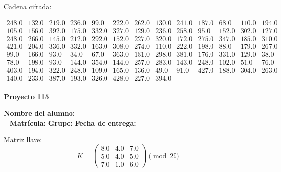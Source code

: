 \documentclass[12pt]{article}
\begin{document}
Cadena cifrada:
\begin{center}
$\begin{array}{lllllllllllll}
248.0 & 132.0 & 219.0 & 236.0 & 99.0 & 222.0 & 262.0 & 130.0 & 241.0 & 187.0 & 68.0 & 110.0 & 194.0\\
105.0 & 156.0 & 392.0 & 175.0 & 332.0 & 327.0 & 129.0 & 236.0 & 258.0 & 95.0 & 152.0 & 302.0 & 127.0\\
248.0 & 266.0 & 145.0 & 212.0 & 292.0 & 152.0 & 227.0 & 320.0 & 172.0 & 275.0 & 347.0 & 185.0 & 310.0\\
421.0 & 204.0 & 336.0 & 332.0 & 163.0 & 308.0 & 274.0 & 110.0 & 222.0 & 198.0 & 88.0 & 179.0 & 267.0\\
99.0 & 166.0 & 93.0 & 34.0 & 67.0 & 363.0 & 181.0 & 298.0 & 381.0 & 176.0 & 331.0 & 129.0 & 38.0\\
78.0 & 198.0 & 93.0 & 144.0 & 354.0 & 144.0 & 257.0 & 283.0 & 143.0 & 248.0 & 102.0 & 51.0 & 76.0\\
403.0 & 194.0 & 322.0 & 248.0 & 109.0 & 165.0 & 136.0 & 49.0 & 91.0 & 427.0 & 188.0 & 304.0 & 263.0\\
140.0 & 233.0 & 387.0 & 193.0 & 326.0 & 428.0 & 227.0 & 394.0\\
\end{array}$
\end{center}

\newpage


\textbf{Proyecto 115}

\textbf{Nombre del alumno:} \underline{\hspace{13cm}}\\\
\vspace{1cm}
\textbf{Matrícula:} \underline{\hspace{4cm}} \hspace{1cm}
\textbf{Grupo:} \underline{\hspace{2cm}}
\textbf{Fecha de entrega:} \underline{\hspace{2cm}}

\medskip

Matriz llave:
\[
K = \begin{pmatrix}
8.0 & 4.0 & 7.0\\
5.0 & 4.0 & 5.0\\
7.0 & 1.0 & 6.0
\end{pmatrix} \pmod{29}
\]
\end{document}
